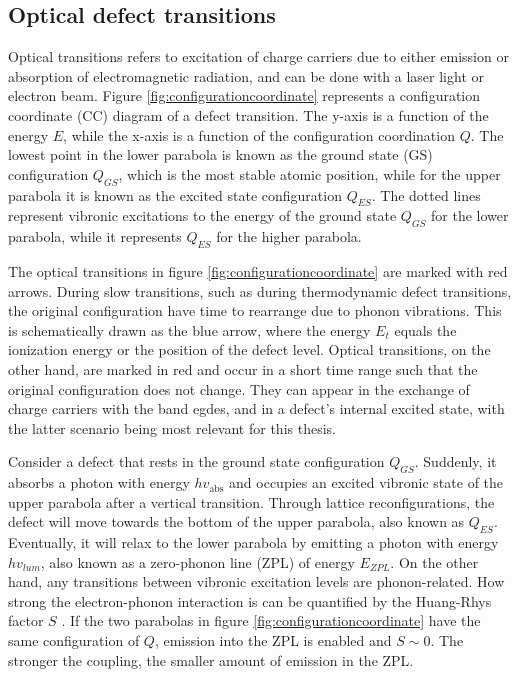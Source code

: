 \subsection{Optical defect transitions}

Optical transitions refers to excitation of charge carriers due to either emission or absorption of electromagnetic radiation, and can be done with a laser light or electron beam. Figure \ref{fig:configurationcoordinate} represents a configuration coordinate (CC) diagram of a defect transition. The y-axis is a function of the energy $E$, while the x-axis is a function of the configuration coordination $Q$. The lowest point in the lower parabola is known as the ground state (GS) configuration $Q_{GS}$, which is the most stable atomic position, while for the upper parabola it is known as the excited state configuration $Q_{ES}$. The dotted lines represent vibronic excitations to the energy of the ground state $Q_{GS}$ for the lower parabola, while it represents $Q_{ES}$ for the higher parabola.



The optical transitions in figure \ref{fig:configurationcoordinate} are marked with red arrows. During slow transitions, such as during thermodynamic defect transitions, the original configuration have time to rearrange due to phonon vibrations. This is schematically drawn as the blue arrow, where the energy $E_t$ equals the ionization energy or the position of the defect level. Optical transitions, on the other hand, are marked in red and occur in a short time range such that the original configuration does not change. They can appear in the exchange of charge carriers with the band egdes, and in a defect's internal excited state, with the latter scenario being most relevant for this thesis.

Consider a defect that rests in the ground state configuration $Q_{GS}$. Suddenly, it absorbs a photon with energy $h v_{\text{abs}}$ and occupies an excited vibronic state of the upper parabola after a vertical transition. Through lattice reconfigurations, the defect will move towards the bottom of the upper parabola, also known as $Q_{ES}$. Eventually, it will relax to the lower parabola by emitting a photon with energy $h v_{lum}$, also known as a zero-phonon line (ZPL) of energy $E_{ZPL}$. On the other hand, any transitions between vibronic excitation levels are phonon-related. How strong the electron-phonon interaction is can be quantified by the Huang-Rhys factor $S$ \cite{Huang1950}. If the two parabolas in figure \ref{fig:configurationcoordinate} have the same configuration of $Q$, emission into the ZPL is enabled and $S\sim 0$. The stronger the coupling, the smaller amount of emission in the ZPL.

